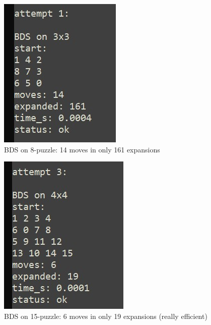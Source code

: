 \documentclass[letterpaper]{article}
\begin{document}
\begin{figure}[h]
\centering
\includegraphics[width=0.85\columnwidth]{bds_3x3.jpg}
\caption{BDS on 8-puzzle: 14 moves in only 161 expansions}
\end{figure}

\begin{figure}[h]
\centering
\includegraphics[width=0.85\columnwidth]{bds_4x4.jpg}
\caption{BDS on 15-puzzle: 6 moves in only 19 expansions (really efficient)}
\end{figure}
\end{document}
